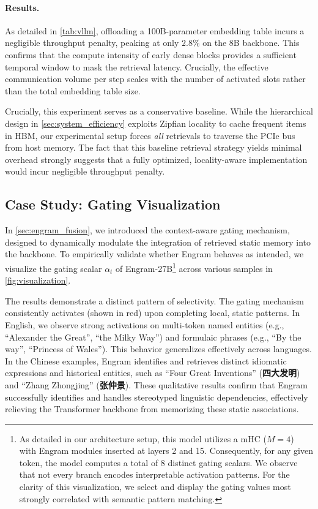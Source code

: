 \paragraph{Results.}
As detailed in \autoref{tab:vllm}, offloading a 100B-parameter embedding table incurs a negligible throughput penalty, peaking at only $2.8\%$ on the 8B backbone.
This confirms that the compute intensity of early dense blocks provides a sufficient temporal window to mask the retrieval latency. Crucially, the effective communication volume per step scales with the number of activated slots rather than the total embedding table size.

Crucially, this experiment serves as a conservative baseline. While the hierarchical design in \autoref{sec:system_efficiency} exploits Zipfian locality to cache frequent items in HBM, our experimental setup forces \textit{all} retrievals to traverse the PCIe bus from host memory. The fact that this baseline retrieval strategy yields minimal overhead strongly suggests that a fully optimized, locality-aware implementation would incur negligible throughput penalty.


\subsection{Case Study: Gating Visualization}
\label{sec:case_study}

In \autoref{sec:engram_fusion}, we introduced the context-aware gating mechanism, designed to dynamically modulate the integration of retrieved static memory into the backbone. To empirically validate whether Engram behaves as intended, we visualize the gating scalar $\alpha_t$ of Engram-27B\footnote{As detailed in our architecture setup, this model utilizes a mHC ($M=4$) with Engram modules inserted at layers 2 and 15. Consequently, for any given token, the model computes a total of 8 distinct gating scalars. We observe that not every branch encodes interpretable activation patterns. For the clarity of this visualization, we select and display the gating values most strongly correlated with semantic pattern matching.} across various samples in \autoref{fig:visualization}.

The results demonstrate a distinct pattern of selectivity. The gating mechanism consistently activates (shown in red) upon completing local, static patterns. In English, we observe strong activations on multi-token named entities (e.g., ``Alexander the Great'', ``the Milky Way'') and formulaic phrases (e.g., ``By the way'', ``Princess of Wales''). This behavior generalizes effectively across languages. In the Chinese examples, Engram identifies and retrieves distinct idiomatic expressions and historical entities, such as ``Four Great Inventions'' (\textbf{四大发明}) and ``Zhang Zhongjing'' (\textbf{张仲景}). These qualitative results confirm that Engram successfully identifies and handles stereotyped linguistic dependencies, effectively relieving the Transformer backbone from memorizing these static associations.

